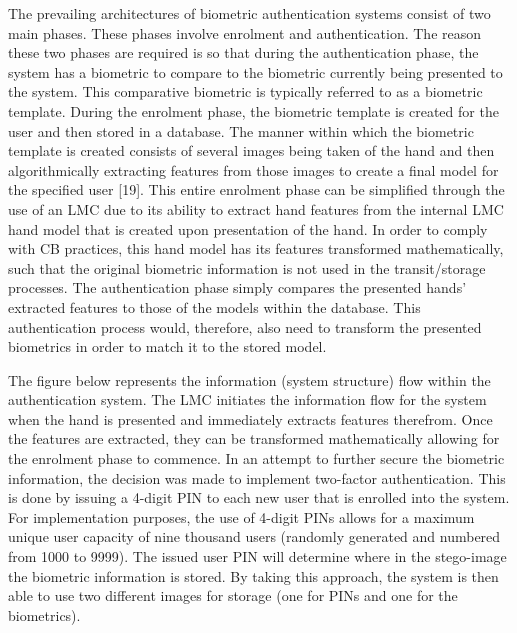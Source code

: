 The prevailing architectures of biometric authentication systems consist of two main phases. These phases involve enrolment and authentication. The reason these two phases are required is so that during the authentication phase, the system has a biometric to compare to the biometric currently being presented to the system. This comparative biometric is typically referred to as a biometric template. During the enrolment phase, the biometric template is created for the user and then stored in a database. The manner within which the biometric template is created consists of several images being taken of the hand and then algorithmically extracting features from those images to create a final model for the specified user [19]. This entire enrolment phase can be simplified through the use of an LMC due to its ability to extract hand features from the internal LMC hand model that is created upon presentation of the hand. In order to comply with CB practices, this hand model has its features transformed mathematically, such that the original biometric information is not used in the transit/storage processes. The authentication phase simply compares the presented hands’ extracted features to those of the models within the database. This authentication process would, therefore, also need to transform the presented biometrics in order to match it to the stored model.

The figure below represents the information (system structure) flow within the authentication system. The LMC initiates the information flow for the system when the hand is presented and immediately extracts features therefrom. Once the features are extracted, they can be transformed mathematically allowing for the enrolment phase to commence. In an attempt to further secure the biometric information, the decision was made to implement two-factor authentication. This is done by issuing a 4-digit PIN to each new user that is enrolled into the system. For implementation purposes, the use of 4-digit PINs allows for a maximum unique user capacity of nine thousand users (randomly generated and numbered from 1000 to 9999). The issued user PIN will determine where in the stego-image the biometric information is stored. By taking this approach, the system is then able to use two different images for storage (one for PINs and one for the biometrics). 

    
